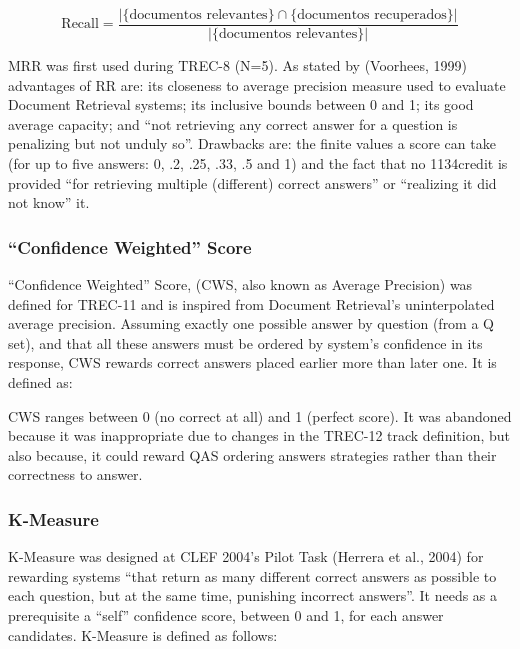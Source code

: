 \begin{equation}\label{eq:recall}
  \mbox{Recall}=\frac{|\{\mbox{documentos relevantes}\}\cap\{\mbox{documentos recuperados}\}|}{|\{\mbox{documentos relevantes}\}|} 
\end{equation}


 
 
MRR was first used during TREC-8 (N=5). As stated by 
(Voorhees, 1999) advantages of RR are: its closeness to 
average precision measure used to evaluate Document 
Retrieval systems; its inclusive bounds between 0 and 1; its 
good average capacity; and “not retrieving any correct 
answer for a question is penalizing but not unduly so”. 
Drawbacks are: the finite values a score can take (for up to 
five answers: 0, .2, .25, .33, .5 and 1) and the fact that no 
1134credit is provided “for retrieving multiple (different) correct 
answers” or “realizing it did not know” it. 


\subsubsection*{“Confidence Weighted” Score}
“Confidence Weighted” Score, (CWS, also known as 
Average Precision) was defined for TREC-11 and is inspired 
from Document Retrieval’s uninterpolated average precision. 
Assuming exactly one possible answer by question (from a Q 
set), and that all these answers must be ordered by system’s 
confidence in its response, CWS rewards correct answers 
placed earlier more than later one. It is defined as: 
 
CWS ranges between 0 (no correct at all) and 1 (perfect 
score). It was abandoned because it was inappropriate due to 
changes in the TREC-12 track definition, but also because, it 
could reward QAS ordering answers strategies rather than 
their correctness to answer. 

\subsubsection*{K-Measure}
K-Measure was designed at CLEF 2004’s Pilot Task 
(Herrera et al., 2004) for rewarding systems “that return as 
many different correct answers as possible to each question, 
but at the same time, punishing incorrect answers”. It needs 
as a prerequisite a “self” confidence score, between 0 and 1, 
for each answer candidates. K-Measure is defined as follows: 
 
